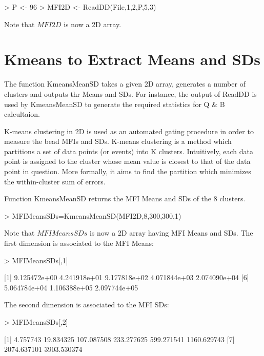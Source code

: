 \documentclass{article}
\begin{document}
\begin{Schunk}
\begin{Sinput}
> P <- 96	
> MFI2D <- ReadDD(File,1,2,P,5,3)
\end{Sinput}
\end{Schunk}

Note that $MFI2D$ is now a 2D array.

\section{Kmeans to Extract Means and SDs}\label{kmean}

The function KmeansMeanSD takes a given 2D array, generates a number of clusters and outputs thr Means and SDs. 
For instance, the output of ReadDD is used by KmeansMeanSD to generate the required statistics for Q \& B calcultaion. 

K-means clustering in 2D is used as an automated gating procedure in order to measure the bead MFIs and SDs. K-means clustering is a method which partitions a set of data points (or events) into K clusters. Intuitively, each data point is assigned to the cluster whose mean value is closest to that of the data point in question. More formally, it aims to find the partition which minimizes the within-cluster sum of errors.


Function KmeansMeanSD returns the MFI Means and SDs of the 8 clusters.
\begin{Schunk}
\begin{Sinput}
> MFIMeansSDs=KmeansMeanSD(MFI2D,8,300,300,1)
\end{Sinput}
\end{Schunk}

Note that $MFIMeansSDs$ is now a 2D array having MFI Means and SDs.
The first dimension is associated to the MFI Means:
\begin{Schunk}
\begin{Sinput}
> MFIMeansSDs[,1]
\end{Sinput}
[1] 9.125472e+00 4.241918e+01 9.177818e+02 4.071844e+03 2.074090e+04
[6] 5.064784e+04 1.106388e+05 2.097744e+05\end{Schunk}

The second dimension is associated to the MFI SDs:
\begin{Schunk}
\begin{Sinput}
> MFIMeansSDs[,2]
\end{Sinput}
[1]    4.757743   19.834325  107.087508  233.277625  599.271541 1160.629743
[7] 2074.637101 3903.530374\end{Schunk}
\end{document}
